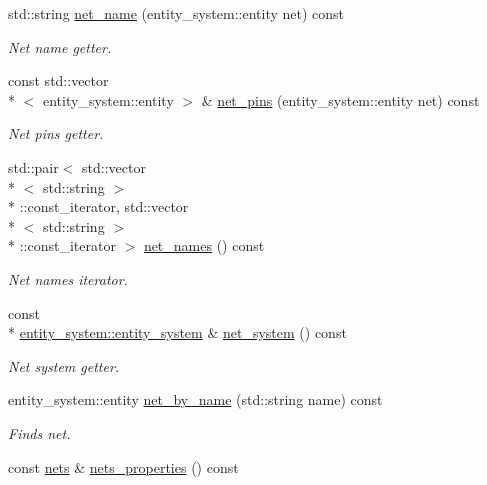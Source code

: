 \begin{DoxyCompactItemize}
std\-::string \hyperlink{classophidian_1_1netlist_1_1netlist_a2810d367cfae0dd1f52b829993341adf}{net\-\_\-name} (entity\-\_\-system\-::entity net) const 
\begin{DoxyCompactList}\small\item\em Net name getter. \end{DoxyCompactList}\item 
const std\-::vector\\*
$<$ entity\-\_\-system\-::entity $>$ \& \hyperlink{classophidian_1_1netlist_1_1netlist_aff297c1071be8eec7838a9c734768771}{net\-\_\-pins} (entity\-\_\-system\-::entity net) const 
\begin{DoxyCompactList}\small\item\em Net pins getter. \end{DoxyCompactList}\item 
std\-::pair$<$ std\-::vector\\*
$<$ std\-::string $>$\\*
\-::const\-\_\-iterator, std\-::vector\\*
$<$ std\-::string $>$\\*
\-::const\-\_\-iterator $>$ \hyperlink{classophidian_1_1netlist_1_1netlist_a3aad34720cad4872b7a0d2df5575689f}{net\-\_\-names} () const 
\begin{DoxyCompactList}\small\item\em Net names iterator. \end{DoxyCompactList}\item 
const \\*
\hyperlink{classophidian_1_1entity__system_1_1entity__system}{entity\-\_\-system\-::entity\-\_\-system} \& \hyperlink{classophidian_1_1netlist_1_1netlist_acf0b34c52425b748d59dad730f986040}{net\-\_\-system} () const 
\begin{DoxyCompactList}\small\item\em Net system getter. \end{DoxyCompactList}\item 
entity\-\_\-system\-::entity \hyperlink{classophidian_1_1netlist_1_1netlist_a85c97349ad0492cb9a741c43fc8e8703}{net\-\_\-by\-\_\-name} (std\-::string name) const 
\begin{DoxyCompactList}\small\item\em Finds net. \end{DoxyCompactList}\item 
const \hyperlink{classophidian_1_1netlist_1_1nets}{nets} \& \hyperlink{classophidian_1_1netlist_1_1netlist_ae643902ea56d79268ae044a5f732c7fb}{nets\-\_\-properties} () const 

\end{DoxyCompactItemize}
